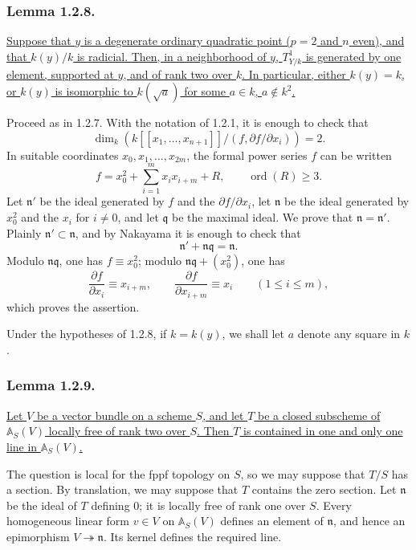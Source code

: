 \subsubsection*{Lemma 1.2.8.}
\underline{Suppose that $y$ is a degenerate ordinary quadratic point
($p=2$ and $n$ even), and that $k(y)/k$ is radicial.  Then, in a
neighborhood of $y$, $T^1_{Y/k}$ is generated by one element,
supported at $y$, and of rank two over $k$.  In particular, either
$k(y)=k$, or $k(y)$ is isomorphic to $k(\sqrt a)$ for some
$a\in k$, $a\notin k^2$.}

Proceed as in 1.2.7.  With the notation of 1.2.1, it is enough to
check that
\[
\dim_k\left(
k[[x_1,\ldots,x_{n+1}]]\big/
  (f,\partial f/\partial x_i)
\right)=2.
\]
In suitable coordinates $x_0,x_1,\ldots,x_{2m}$, the formal power
series $f$ can be written
\[
f=x_0^2+\sum_{i=1}^m x_ix_{i+m}+R,
\qquad\operatorname{ord}(R)\geq3.
\]
Let $\mathfrak n'$ be the ideal generated by $f$ and the
$\partial f/\partial x_i$, let $\mathfrak n$ be the ideal generated
by $x_0^2$ and the $x_i$ for $i\ne0$, and let $\mathfrak q$ be the
maximal ideal.  We prove that $\mathfrak n=\mathfrak n'$.  Plainly
$\mathfrak n'\subset\mathfrak n$, and by Nakayama it is enough to
check that
\[
\mathfrak n'+\mathfrak n\mathfrak q=\mathfrak n.
\]
Modulo $\mathfrak n\mathfrak q$, one has $f\equiv x_0^2$; modulo
$\mathfrak n\mathfrak q+(x_0^2)$, one has
\[
\frac{\partial f}{\partial x_i}\equiv x_{i+m},
\qquad
\frac{\partial f}{\partial x_{i+m}}\equiv x_i
\qquad(1\leq i\leq m),
\]
which proves the assertion.

Under the hypotheses of 1.2.8, if $k=k(y)$, we shall let $a$ denote
any square in $k$.

\subsubsection*{Lemma 1.2.9.}
\underline{Let $V$ be a vector bundle on a scheme $S$, and let $T$
be a closed subscheme of $\mathbb A_S(V)$ locally free of rank two
over $S$.  Then $T$ is contained in one and only one line in
$\mathbb A_S(V)$.}

The question is local for the fppf topology on $S$, so we may suppose
that $T/S$ has a section.  By translation, we may suppose that $T$
contains the zero section.  Let $\mathfrak n$ be the ideal of $T$
defining $0$; it is locally free of rank one over $S$.  Every
homogeneous linear form $v\in V$ on $\mathbb A_S(V)$ defines an
element of $\mathfrak n$, and hence an epimorphism
$V\twoheadrightarrow\mathfrak n$.  Its kernel defines the required
line.

